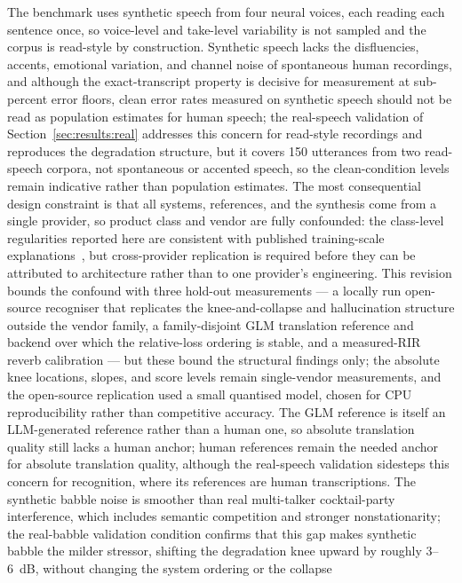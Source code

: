 The benchmark uses synthetic speech from four neural voices, each reading
each sentence once, so voice-level and take-level variability is not
sampled and the corpus is read-style by construction. Synthetic
speech lacks the disfluencies, accents, emotional variation, and channel
noise of spontaneous human recordings, and although the exact-transcript
property is decisive for measurement at sub-percent error floors, clean
error rates measured on synthetic speech should not be read as population
estimates for human speech; the real-speech validation of
Section~\ref{sec:results:real} addresses this concern for read-style
recordings and reproduces the degradation structure, but it covers 150
utterances from two read-speech corpora, not spontaneous or accented
speech, so the clean-condition levels remain indicative rather than
population estimates. The most consequential design
constraint is that all systems, references, and the synthesis come from a
single provider, so product class and vendor are fully confounded: the
class-level regularities reported here are consistent with published
training-scale explanations~\cite{radford2023robust}, but cross-provider
replication is required before they can be attributed to architecture
rather than to one provider's engineering. This revision bounds the
confound with three hold-out measurements --- a locally run open-source
recogniser that replicates the knee-and-collapse and hallucination
structure outside the vendor family, a family-disjoint GLM translation
reference and backend over which the relative-loss ordering is stable, and
a measured-RIR reverb calibration --- but these bound the structural
findings only; the absolute knee locations, slopes, and score levels
remain single-vendor measurements, and the open-source replication used a
small quantised model, chosen for CPU reproducibility rather than
competitive accuracy. The GLM reference is itself an LLM-generated
reference rather than a human one, so absolute translation quality still
lacks a human anchor; human references remain the needed anchor for
absolute translation quality, although the
real-speech validation sidesteps this concern for recognition, where its
references are human transcriptions. The synthetic babble
noise is smoother than real multi-talker cocktail-party interference,
which includes semantic competition and stronger nonstationarity; the
real-babble validation condition confirms that this gap makes synthetic
babble the milder stressor, shifting the degradation knee upward by
roughly 3--6~dB, without changing the system ordering or the collapse
